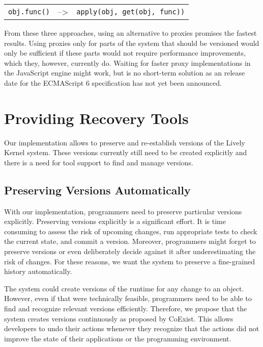 \begin{center}
    \begin{tabular}{ lll }
    \lstinline|obj.func()| & --> & \lstinline|apply(obj, get(obj, func))| \\
    \end{tabular}
\end{center}

From these three approaches, using an alternative to proxies promises the fastest results.
Using proxies only for parts of the system that should be versioned would only be sufficient if these parts would not require performance improvements, which they, however, currently do.
Waiting for faster proxy implementations in the JavaScript engine might work, but is no short-term solution as an release date for the ECMAScript 6 specification has not yet been announced.


\section{Providing Recovery Tools}

Our implementation allows to preserve and re-establish versions of the Lively Kernel system.
These versions currently still need to be created explicitly and there is a need for tool support to find and manage versions.


\subsection{Preserving Versions Automatically}

With our implementation, programmers need to preserve particular versions explicitly.
Preserving versions explicitly is a significant effort.
It is time consuming to assess the risk of upcoming changes, run appropriate tests to check the current state, and commit a version.
Moreover, programmers might forget to preserve versions or even deliberately decide against it after underestimating the risk of changes.
For these reasons, we want the system to preserve a fine-grained history automatically.

The system could create versions of the runtime for any change to an object.
However, even if that were technically feasible, programmers need to be able to find and recognize relevant versions efficiently.
Therefore, we propose that the system creates versions continuously as proposed by CoExist.
This allows developers to undo their actions whenever they recognize that the actions did not improve the state of their applications or the programming environment.

